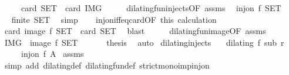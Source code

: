 \begin{isabellebody}
\ \ \ \ {\isacharparenleft}\ {\isacartoucheopen}card\ {\isacharquery}SET\ {\isacharequal}\ card\ {\isacharquery}IMG{\isacartoucheclose}{\isacharparenright}\isanewline
%
\isadelimproof
%
\endisadelimproof
%
\isatagproof
{}\isamarkupfalse%
\ {\isacharminus}\isanewline
\ \ \isamarkupfalse%
\ dilating{\isacharunderscore}fun{\isacharunderscore}injects{\isacharbrackleft}OF\ assms{\isacharbrackright}\ \isamarkupfalse%
\ {\isacartoucheopen}inj{\isacharunderscore}on\ f\ {\isacharquery}SET{\isacartoucheclose}\ \isacommand{{\isachardot}}\isamarkupfalse%
\isanewline
\ \ \isamarkupfalse%
\ \isamarkupfalse%
\ {\isacartoucheopen}finite\ {\isacharquery}SET{\isacartoucheclose}\ \isamarkupfalse%
\ simp\isanewline
\ \ \isamarkupfalse%
\ inj{\isacharunderscore}on{\isacharunderscore}iff{\isacharunderscore}eq{\isacharunderscore}card{\isacharbrackleft}OF\ this{\isacharbrackright}\ calculation\ \isamarkupfalse%
\ {\isacartoucheopen}card\ {\isacharparenleft}image\ f\ {\isacharquery}SET{\isacharparenright}\ {\isacharequal}\ card\ {\isacharquery}SET{\isacartoucheclose}\ \isamarkupfalse%
\ blast\isanewline
\ \ \isamarkupfalse%
\ \isamarkupfalse%
\ dilating{\isacharunderscore}fun{\isacharunderscore}image{\isacharbrackleft}OF\ assms{\isacharbrackright}\ \isamarkupfalse%
\ {\isacartoucheopen}{\isacharquery}IMG\ {\isacharequal}\ image\ f\ {\isacharquery}SET{\isacartoucheclose}\ \isacommand{{\isachardot}}\isamarkupfalse%
\isanewline
\ \ \isamarkupfalse%
\ \isamarkupfalse%
\ {\isacharquery}thesis\ \isamarkupfalse%
\ auto\isanewline
{}\isamarkupfalse%
%
\endisatagproof
{\isafoldproof}%
%
\isadelimproof
\isanewline
%
\endisadelimproof
\isanewline
{}\isamarkupfalse%
\ dilating{\isacharunderscore}injects{\isacharcolon}\isanewline
\ \ \ {\isacartoucheopen}dilating\ f\ sub\ r{\isacartoucheclose}\isanewline
\ \ \ \ \ {\isacartoucheopen}inj{\isacharunderscore}on\ f\ A{\isacartoucheclose}\isanewline
%
\isadelimproof
%
\endisadelimproof
%
\isatagproof
{}\isamarkupfalse%
\ assms\ \isamarkupfalse%
\ {\isacharparenleft}simp\ add{\isacharcolon}\ dilating{\isacharunderscore}def\ dilating{\isacharunderscore}fun{\isacharunderscore}def\ strict{\isacharunderscore}mono{\isacharunderscore}imp{\isacharunderscore}inj{\isacharunderscore}on{\isacharparenright}%

\end{isabellebody}
